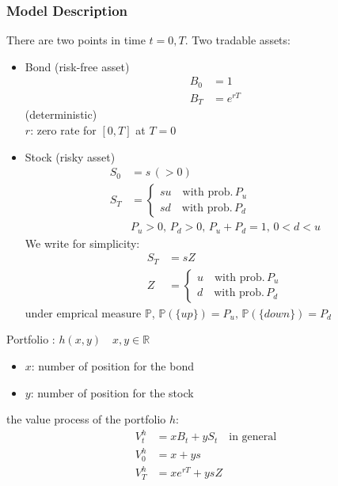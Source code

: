 \documentclass[a4paper,11pt]{jsarticle}
\theoremstyle{definition}
\begin{document}
\subsubsection{Model Description}

There are two points in time $t=0,T$.
Two tradable assets:
\begin{itemize}
  \item Bond (risk-free asset)
  \begin{align}
    B_0&=1 \\
    B_T&=e^{rT}
  \end{align}
  (deterministic) \\
  $r$: zero rate for $[0,T]$ at $T=0$
  \item Stock (risky asset)
  \begin{align}
    S_0&=s \, (>0) \\ 
    S_T&=
    \begin{cases}
      su \quad \mbox{with prob.} \, P_u \\
      sd \quad \mbox{with prob.} \, P_d
    \end{cases} \\
    &P_u>0, \, P_d>0, \, P_u+P_d=1, \, 0<d<u
  \end{align}
  We write for simplicity:
  \begin{align}
    S_T&=sZ \\
    Z&=
    \begin{cases}
      u \quad \mbox{with prob.} \, P_u \\
      d \quad \mbox{with prob.} \, P_d
    \end{cases}
  \end{align}
  under emprical measure $\mathbb{P}$, 
  $\mathbb{P}(\{up\})=P_u, \,
  \mathbb{P}(\{down\})=P_d$
\end{itemize}

Portfolio : $h(x,y) \quad x,y\in\mathbb{R}$
\begin{itemize}
  \item $x$: number of position for the bond
  \item $y$: number of position for the stock
\end{itemize}

the value process of the portfolio $h$:
\begin{align}
  V_t^h&=xB_t+yS_t \quad \mbox{in general} \\
  V_0^h&=x+ys \\
  V_T^h&=xe^{rT}+ysZ
\end{align}
\end{document}
